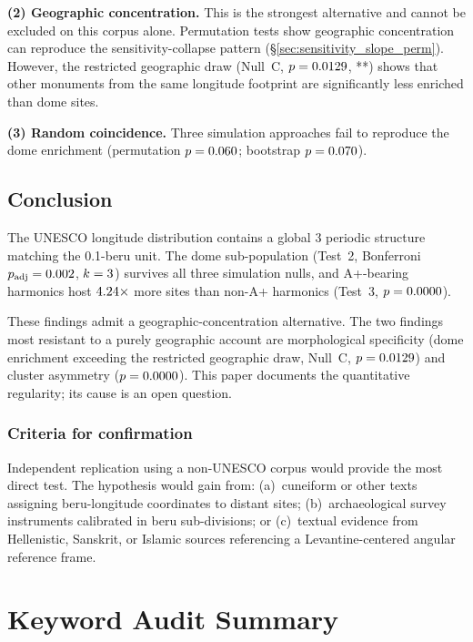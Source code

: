 \documentclass[12pt,a4paper]{article}
\begin{document}
\textbf{(2) Geographic concentration.}
This is the strongest alternative and cannot be excluded on this corpus
alone. Permutation tests show geographic concentration can reproduce the
sensitivity-collapse pattern (\S\ref{sec:sensitivity_slope_perm}).
However, the restricted geographic draw (Null~C,
$p = 0.0129$, **) shows that other monuments from the
same longitude footprint are significantly less enriched than dome sites.

\textbf{(3) Random coincidence.}
Three simulation approaches fail to reproduce the dome enrichment
(permutation $p = 0.060$; bootstrap $p = 0.070$).

\subsection{Conclusion}

The UNESCO longitude distribution contains a global 3\textdegree{} periodic
structure matching the 0.1-beru unit. The dome sub-population (Test~2,
Bonferroni $p_\mathrm{adj} = 0.002$, $k = 3$) survives all three
simulation nulls, and A+-bearing harmonics host
$4.24\times$ more sites than non-A+ harmonics (Test~3,
$p = 0.0000$).

These findings admit a geographic-concentration alternative.
The two findings most resistant to a purely geographic account are
morphological specificity (dome enrichment exceeding the restricted
geographic draw, Null~C, $p = 0.0129$) and cluster
asymmetry ($p = 0.0000$). This paper documents the quantitative
regularity; its cause is an open question.

\subsubsection*{Criteria for confirmation}

Independent replication using a non-UNESCO corpus would provide the most
direct test. The hypothesis would gain from: (a)~cuneiform or other texts
assigning beru-longitude coordinates to distant sites;
(b)~archaeological survey instruments calibrated in beru sub-divisions; or
(c)~textual evidence from Hellenistic, Sanskrit, or Islamic sources
referencing a Levantine-centered angular reference frame.

\appendix
\newpage

\section{Keyword Audit Summary}
\label{sec:kwdaudit}
\end{document}
